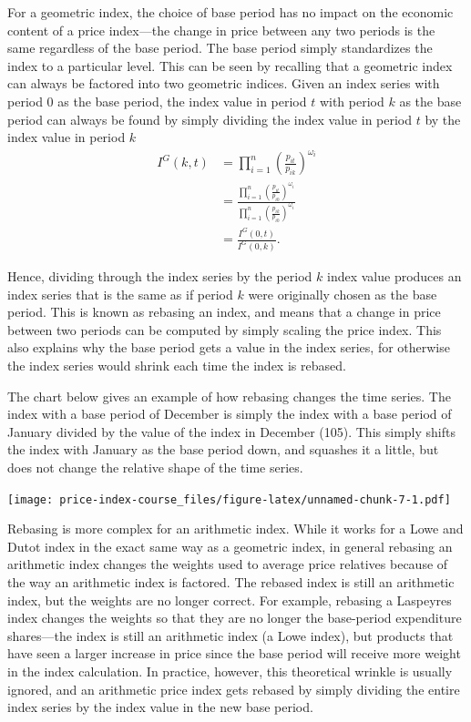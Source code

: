 \documentclass[
]{article}
\begin{document}
For a geometric index, the choice of base period has no impact on the economic content of a price index---the change in price between any two periods is the same regardless of the base period. The base period simply standardizes the index to a particular level. This can be seen by recalling that a geometric index can always be factored into two geometric indices. Given an index series with period 0 as the base period, the index value in period \(t\) with period \(k\) as the base period can always be found by simply dividing the index value in period \(t\) by the index value in period \(k\)
\begin{align*}
I^{G}(k, t) &= \prod_{i = 1}^{n} \left(\frac{p_{it}}{p_{ik}}\right)^{\omega_{i}} \\
&= \frac{\prod_{i = 1}^{n} \left(\frac{p_{it}}{p_{i0}}\right)^{\omega_{i}}}{\prod_{i = 1}^{n} \left(\frac{p_{ik}}{p_{i0}}\right)^{\omega_{i}}} \\
&= \frac{I^{G}(0, t)}{I^{G}(0, k)}.
\end{align*}

Hence, dividing through the index series by the period \(k\) index value produces an index series that is the same as if period \(k\) were originally chosen as the base period. This is known as rebasing an index, and means that a change in price between two periods can be computed by simply scaling the price index. This also explains why the base period gets a value in the index series, for otherwise the index series would shrink each time the index is rebased.

The chart below gives an example of how rebasing changes the time series. The index with a base period of December is simply the index with a base period of January divided by the value of the index in December (105). This simply shifts the index with January as the base period down, and squashes it a little, but does not change the relative shape of the time series.

\texttt{[image: price-index-course\_files/figure-latex/unnamed-chunk-7-1.pdf]}

Rebasing is more complex for an arithmetic index. While it works for a Lowe and Dutot index in the exact same way as a geometric index, in general rebasing an arithmetic index changes the weights used to average price relatives because of the way an arithmetic index is factored. The rebased index is still an arithmetic index, but the weights are no longer correct. For example, rebasing a Laspeyres index changes the weights so that they are no longer the base-period expenditure shares---the index is still an arithmetic index (a Lowe index), but products that have seen a larger increase in price since the base period will receive more weight in the index calculation. In practice, however, this theoretical wrinkle is usually ignored, and an arithmetic price index gets rebased by simply dividing the entire index series by the index value in the new base period.
\end{document}
